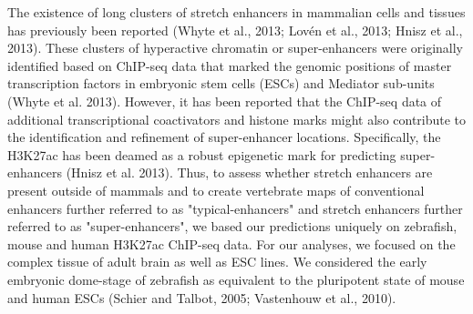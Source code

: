 		The existence of long clusters of stretch enhancers in mammalian cells and tissues has previously been reported (Whyte et al., 2013; Lov\'en et al., 2013; Hnisz et al., 2013). These clusters of hyperactive chromatin or super-enhancers were originally identified based on ChIP-seq data that marked the genomic positions of master transcription factors in embryonic stem cells (ESCs) and Mediator sub-units (Whyte et al. 2013). However, it has been reported that the ChIP-seq data of additional transcriptional coactivators and histone marks might also contribute to the identification and refinement of super-enhancer locations. Specifically, the H3K27ac has been deamed as a robust epigenetic mark for predicting super-enhancers (Hnisz et al. 2013). Thus, to assess whether stretch enhancers are present outside of mammals and to create vertebrate maps of conventional enhancers further referred to as "typical-enhancers" and stretch enhancers further referred to as "super-enhancers", we based our predictions uniquely on zebrafish, mouse and human H3K27ac ChIP-seq data. For our analyses, we focused on the complex tissue of adult brain as well as ESC lines. We considered the early embryonic dome-stage of zebrafish as equivalent to the pluripotent state of mouse and human ESCs (Schier and Talbot, 2005; Vastenhouw et al., 2010).\\

